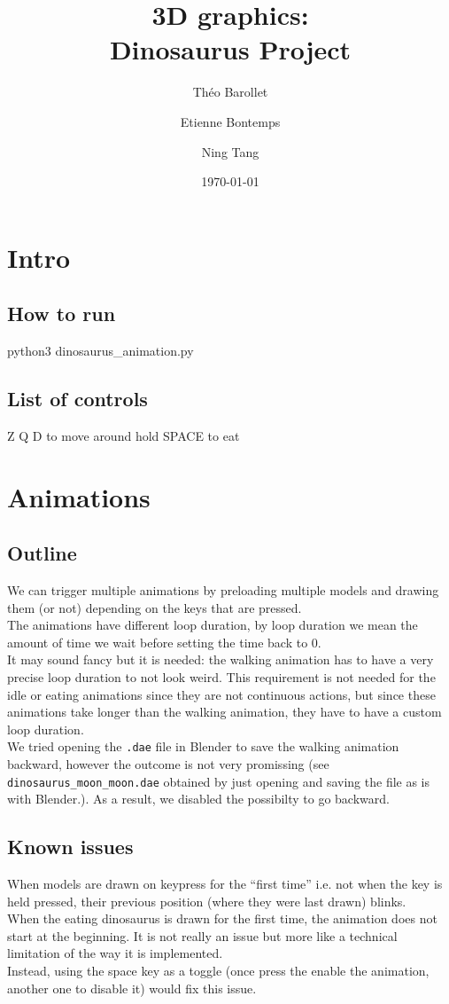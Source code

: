 \documentclass[11pt]{article}
\title{\textbf{3D graphics:}\\ Dinosaurus Project}
\date{\today}
\author{Théo Barollet \and Etienne Bontemps \and Ning Tang}
\begin{document}
\maketitle
\section{Intro}
\subsection*{How to run}
python3 dinosaurus\_animation.py

\subsection*{List of controls}
Z Q D to move around
hold SPACE to eat

\section{Animations}
\subsection*{Outline}
\noindent We can trigger multiple animations by preloading multiple models and drawing them (or not) depending on the keys that are pressed.\\
The animations have different loop duration, by loop duration we mean the amount of time we wait before setting the time back to 0.\\
It may sound fancy but it is needed: the walking animation has to have a very precise loop duration to not look weird. This requirement is not needed for the idle or eating animations since they are not continuous actions, but since these animations take longer than the walking animation, they have to have a custom loop duration.\\
We tried opening the \texttt{.dae} file in Blender to save the walking animation backward, however the outcome is not very promissing (see \texttt{dinosaurus\_moon\_moon.dae} obtained by just opening and saving the file as is with Blender.). As a result, we disabled the possibilty to go backward.\\

\subsection*{Known issues}
\noindent When models are drawn on keypress for the ``first time'' i.e. not when the key is held pressed, their previous position (where they were last drawn) blinks.\\
When the eating dinosaurus is drawn for the first time, the animation does not start at the beginning. It is not really an issue but more like a technical limitation of the way it is implemented.\\
Instead, using the space key as a toggle (once press the enable the animation, another one to disable it) would fix this issue.
\end{document}
